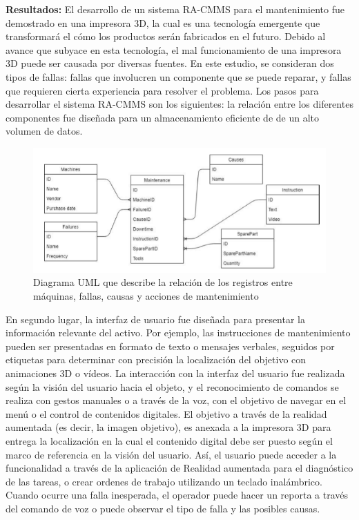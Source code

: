 \begin{description}
\item \textbf{Resultados:} El desarrollo de un sistema RA-CMMS para el mantenimiento fue demostrado en una impresora 3D, la cual es una tecnología emergente que transformará el cómo los productos serán fabricados en el futuro. Debido al avance que subyace en esta tecnología, el mal funcionamiento de una impresora 3D puede ser causada por diversas fuentes. En este estudio, se consideran dos tipos de fallas: fallas que involucren un componente que se puede reparar, y fallas que requieren cierta experiencia para resolver el problema. Los pasos para desarrollar el sistema RA-CMMS son los siguientes: la relación entre los diferentes componentes fue diseñada para un almacenamiento eficiente de de un alto volumen de datos.

\begin{figure}[H]
\centering
\includegraphics[scale=0.7]{images/umla.png}
\caption{Diagrama UML que describe la relación de los registros entre máquinas, fallas, causas y acciones de mantenimiento \citep{aransyash2019}}
\end{figure}




En segundo lugar, la interfaz de usuario fue diseñada para presentar la información relevante del activo. Por ejemplo, las instrucciones de mantenimiento pueden ser presentadas en formato de texto o mensajes verbales, seguidos por etiquetas para determinar con precisión la localización del objetivo con animaciones 3D o vídeos. La interacción con la interfaz del usuario fue realizada según la visión del usuario hacia el objeto, y el reconocimiento de comandos se realiza con gestos manuales o a través de la voz, con el objetivo de navegar en el menú o el control de contenidos digitales. El objetivo a través de la realidad aumentada (es decir, la imagen objetivo), es anexada a la impresora 3D para entrega la localización en la cual el contenido digital debe ser puesto según el marco de referencia en la visión del usuario. Así, el usuario puede acceder a la funcionalidad a través de la aplicación de Realidad aumentada para el diagnóstico de las tareas, o crear ordenes de trabajo utilizando un teclado inalámbrico. Cuando ocurre una falla inesperada, el operador puede hacer un reporta a través del comando de voz o puede observar el tipo de falla y las posibles causas.


\end{description}

